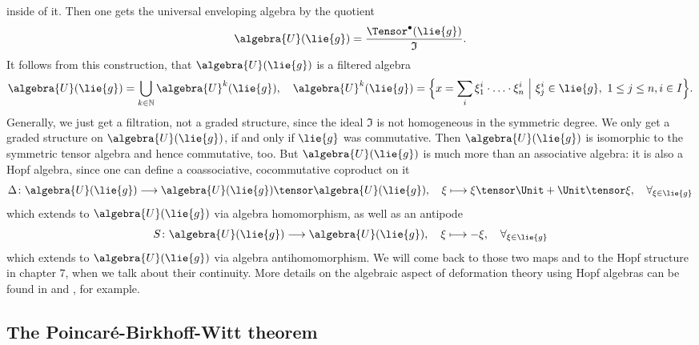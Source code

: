 inside of it. Then one gets the universal enveloping algebra by the quotient
\begin{equation}
	\label{Alg:UnivEnvAlg}
	\algebra{U}(\lie{g})
	=
	\frac{\Tensor^{\bullet}(\lie{g})}{\mathfrak{I}}.
\end{equation}
It follows from this construction, that $\algebra{U}(\lie{g})$ is a filtered 
algebra
\begin{equation*}
	\algebra{U}(\lie{g})
	=
	\bigcup_{k \in \mathbb{N}}
	\algebra{U}^k(\lie{g})
	, \quad
	\algebra{U}^k(\lie{g})
	= 
	\Big\lbrace
		x 
		= 
		\sum_i
		\xi_1^i \cdot \ldots \cdot \xi_n^i
	\ \Big| \ 
		\xi_j^i \in \lie{g}
		, \
		1 \leq j \leq n,
		i \in I
	\Big\rbrace.
\end{equation*}
Generally, we just get a filtration, not a graded structure, since the 
ideal $\mathfrak{I}$ is not homogeneous in the symmetric degree. We only 
get a graded structure on $\algebra{U}(\lie{g})$, if and only if $\lie{g}$ 
was commutative. Then $\algebra{U}(\lie{g})$ is isomorphic to the symmetric
tensor algebra and hence commutative, too. But $\algebra{U}(\lie{g})$
is much more than an associative algebra: it is also a Hopf algebra, 
since one can define a coassociative, cocommutative coproduct on it
\begin{equation*}
	\Delta \colon
	\algebra{U}(\lie{g})
	\longrightarrow
	\algebra{U}(\lie{g})
	\tensor
	\algebra{U}(\lie{g})
	, \quad
	\xi
	\longmapsto
	\xi \tensor \Unit
	+
	\Unit \tensor \xi
	, \quad
	\forall_{\xi \in \lie{g}}
\end{equation*} 
which extends to $\algebra{U}(\lie{g})$ via algebra homomorphism, 
as well as an antipode
\begin{equation*}
	S \colon
	\algebra{U}(\lie{g})
	\longrightarrow
	\algebra{U}(\lie{g})
	, \quad
	\xi
	\longmapsto
	- \xi
	, \quad
	\forall_{\xi \in \lie{g}}
\end{equation*}
which extends to $\algebra{U}(\lie{g})$ via algebra antihomomorphism.
We will come back to those two maps and to the Hopf structure in chapter 7,
when we talk about their continuity. More details on the algebraic
aspect of deformation theory using Hopf algebras can be found in 
\cite{chari.pressley:1994a} and \cite{majid:1995a}, for example.





\subsection{The Poincar\'e-Birkhoff-Witt theorem}
\label{subsec:chap3_PoincareBirkhoffWitt}

